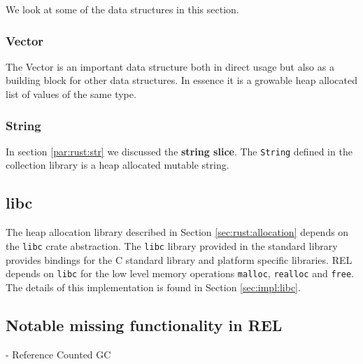 We look at some of the data structures in this section.

\subsubsection{Vector}

The Vector is an important data structure both in direct usage but also as a building block for other data structures.
In essence it is a growable heap allocated list of values of the same type.

\subsubsection{String}

In section \ref{par:rust:str} we discussed the \textbf{string slice}.
The \texttt{String} defined in the collection library is a heap allocated mutable string.

\subsection{libc}

The heap allocation library described in Section \ref{sec:rust:allocation} depends on the \texttt{libc} crate abstraction.
The \texttt{libc} library provided in the standard library provides bindings for the C standard library and platform specific libraries.
REL depends on \texttt{libc} for the low level memory operations \texttt{malloc}, \texttt{realloc} and \texttt{free}.
The details of this implementation is found in Section \ref{sec:impl:libc}. 

\subsection{Notable missing functionality in REL}

- Reference Counted GC

